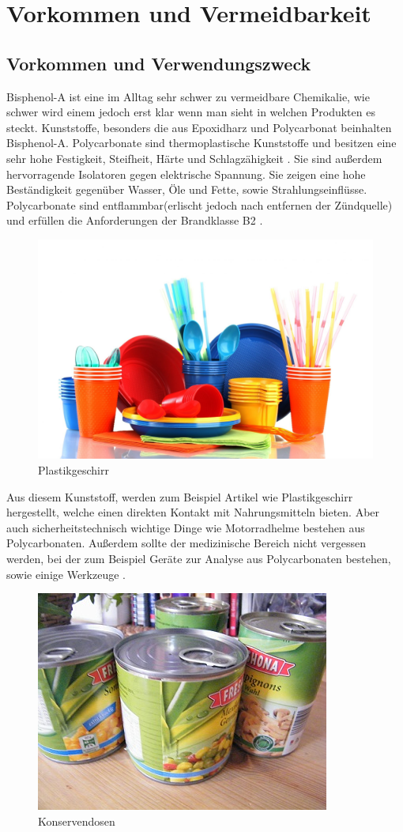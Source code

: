 \section{Vorkommen und Vermeidbarkeit}
\subsection{Vorkommen und Verwendungszweck}
Bisphenol-A ist eine im Alltag sehr schwer zu vermeidbare Chemikalie, wie schwer
wird einem jedoch erst klar wenn man sieht in welchen Produkten es steckt.
Kunststoffe, besonders die aus Epoxidharz und Polycarbonat
beinhalten Bisphenol-A. Polycarbonate sind thermoplastische Kunststoffe
und besitzen eine sehr hohe Festigkeit, Steifheit, Härte und Schlagzähigkeit \cite{Umweltbundesamt2010}.
Sie sind außerdem hervorragende Isolatoren gegen elektrische Spannung.
Sie zeigen eine hohe Beständigkeit gegenüber Wasser, Öle und Fette, sowie
Strahlungseinflüsse. Polycarbonate sind entflammbar(erlischt jedoch nach entfernen der Zündquelle) \cite{Umweltbundesamt2010} und erfüllen die Anforderungen
der Brandklasse B2 \cite{Wikipedia}.
\begin{figure}[htpb]
    \centering
    \includegraphics[width=.75\textwidth]{Plastikgeschirr.jpeg}
    \caption{Plastikgeschirr \cite{Plastikgeschirr}}
\end{figure}
Aus diesem Kunststoff, werden zum Beispiel Artikel wie Plastikgeschirr
hergestellt, welche einen direkten Kontakt mit
Nahrungsmitteln bieten. Aber auch sicherheitstechnisch wichtige Dinge wie
Motorradhelme bestehen aus Polycarbonaten. Außerdem sollte der
medizinische Bereich nicht vergessen werden, bei der zum Beispiel
Geräte zur Analyse aus Polycarbonaten bestehen, sowie einige Werkzeuge
\cite{Umweltbundesamt2010}.
\begin{figure}[htpb]
    \centering
    \includegraphics[width=.5\textwidth]{Konserven.jpg}
    \caption{Konservendosen \cite{Konserven}}
    \end{figure}
